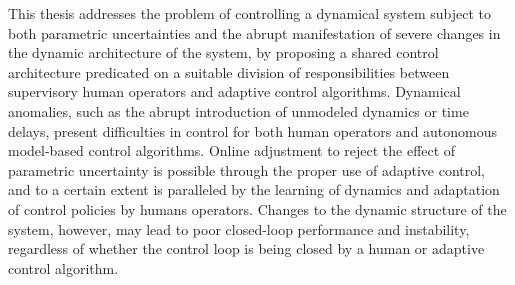 % 
% 
%



This thesis addresses the problem of controlling a dynamical system subject to both parametric uncertainties and the abrupt manifestation of severe changes in the dynamic architecture of the system, by proposing a shared control architecture predicated on a suitable division of responsibilities between supervisory human operators and adaptive control algorithms. Dynamical anomalies, such as the abrupt introduction of unmodeled dynamics or time delays, present difficulties in control for both human operators and autonomous model-based control algorithms. Online adjustment to reject the effect of parametric uncertainty is possible through the proper use of adaptive control, and to a certain extent is paralleled by the learning of dynamics and adaptation of control policies by humans operators. Changes to the dynamic structure of the system, however, may lead to poor closed-loop performance and instability, regardless of whether the control loop is being closed by a human or adaptive control algorithm.

